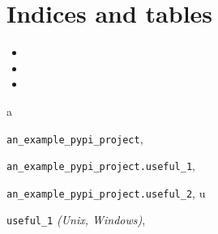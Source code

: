 \documentclass[letterpaper,10pt,english]{sphinxmanual}
\begin{document}
\chapter{Indices and tables}
\label{code:indices-and-tables}\begin{itemize}
\item {} 

\item {} 

\item {} 

\end{itemize}


\renewcommand{\indexname}{Python Module Index}
\begin{theindex}
\def\bigletter#1{{\Large\sffamily#1}\nopagebreak\vspace{1mm}}
\bigletter{a}
\item {\texttt{an\_example\_pypi\_project}}, \pageref{code:module-an_example_pypi_project}
\item {\texttt{an\_example\_pypi\_project.useful\_1}}, \pageref{code:module-an_example_pypi_project.useful_1}
\item {\texttt{an\_example\_pypi\_project.useful\_2}}, \pageref{code:module-an_example_pypi_project.useful_2}
\indexspace
\bigletter{u}
\item {\texttt{useful\_1}} \emph{(Unix, Windows)}, \pageref{code:module-useful_1}
\end{theindex}

\renewcommand{\indexname}{Index}
\printindex
\end{document}
